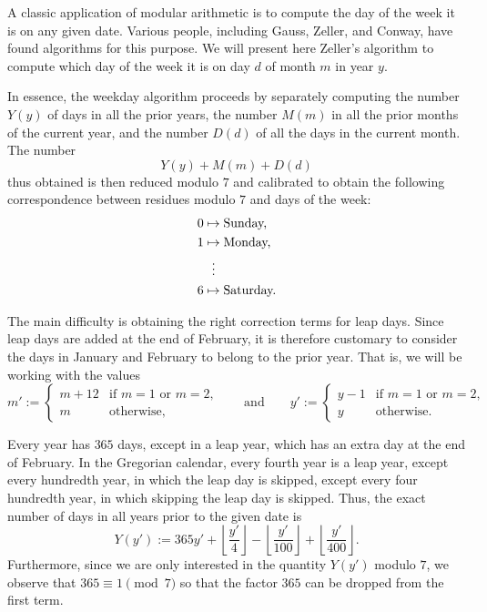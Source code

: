 \begin{example}
  A classic application of modular arithmetic is to compute the day of the week it is on any given date. Various people, including Gauss, Zeller, and Conway, have found algorithms for this purpose. We will present here Zeller's algorithm to compute which day of the week it is on day $d$ of month $m$ in year $y$.

  In essence, the weekday algorithm proceeds by separately computing the number $Y(y)$ of days in all the prior years, the number $M(m)$ in all the prior months of the current year, and the number $D(d)$ of all the days in the current month. The number
  \begin{equation*}
    Y(y)+M(m)+D(d)
  \end{equation*}
  thus obtained is then reduced modulo $7$ and calibrated to obtain the following correspondence between residues modulo $7$ and days of the week:
  \begin{align*}
    0 & \mapsto \text{Sunday,}\\
    1 & \mapsto \text{Monday,}\\
      & \mathrel{\makebox[\widthof{$\mapsto$}][c]{$\vdots$}}
\\
    6 & \mapsto \text{Saturday.}
  \end{align*}

  The main difficulty is obtaining the right correction terms for leap days. Since leap days are added at the end of February, it is therefore customary to consider the days in January and February to belong to the prior year. That is, we will be working with the values
  \begin{equation*}
    m' :=
    \begin{cases}
      m+12 & \text{if $m=1$ or $m=2$,} \\
      m & \text{otherwise,}
    \end{cases}
    \qquad\text{and}\qquad
    y' :=
    \begin{cases}
      y-1 & \text{if $m=1$ or $m=2$,} \\
      y & \text{otherwise.}
    \end{cases}
  \end{equation*}

  Every year has $365$ days, except in a leap year, which has an extra day at the end of February. In the Gregorian calendar, every fourth year is a leap year, except every hundredth year, in which the leap day is skipped, except every four hundredth year, in which skipping the leap day is skipped. Thus, the exact number of days in all years prior to the given date is
  \begin{equation*}
    Y(y') := 365y'+\left\lfloor\frac{y'}{4}\right\rfloor-\left\lfloor\frac{y'}{100}\right\rfloor+\left\lfloor\frac{y'}{400}\right\rfloor.
  \end{equation*}
  Furthermore, since we are only interested in the quantity $Y(y')$ modulo $7$, we observe that $365\equiv 1\pmod 7$ so that the factor $365$ can be dropped from the first term.


\end{example}
